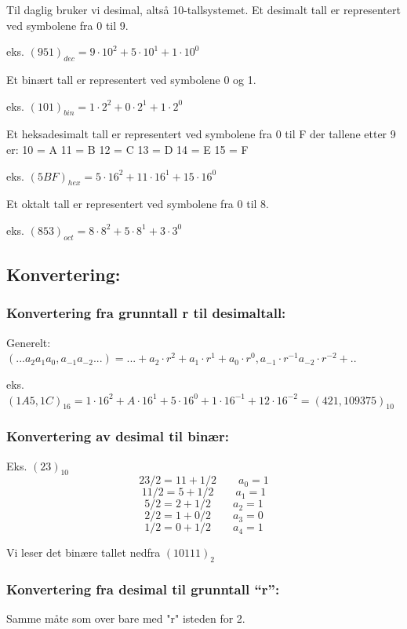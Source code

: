 \documentclass{article}
\begin{document}
	Til daglig bruker vi desimal, altså 10-tallsystemet. Et desimalt tall er representert ved symbolene fra 0 til 9.
	
	eks. $(951)_{dec} = 9 \cdot 10^2 + 5 \cdot 10^1 + 1 \cdot 10^0$
	
	Et binært tall er representert ved symbolene 
	0 og 1.
	
	eks. $ (101)_{bin} = 1 \cdot 2^2 + 0 \cdot 2^1 + 1 \cdot 2^0$
	
	Et heksadesimalt tall er representert ved symbolene 
	fra 0 til F der tallene etter 9 er:
	10 = A
	11 = B
	12 = C
	13 = D
	14 = E
	15 = F
	
	eks. $(5BF)_{hex} = 5 \cdot 16^2 + 11 \cdot 16^1 + 15 \cdot 16^0$ 
	
	Et oktalt tall er representert ved symbolene fra 0 til 8.
	
	eks. $(853)_{oct} = 8 \cdot 8^2 + 5 \cdot 8^1 + 3 \cdot 3^0$

	\subsection*{Konvertering:}
	
	\subsubsection*{Konvertering fra grunntall r til desimaltall:}
	Generelt:
	$(...a_2 a_1 a_0 , a_{-1} a_{-2}...) = ... + a_2 \cdot r^2 + a_1 \cdot r^1 + a_0 \cdot r^0 , a_{-1} \cdot r^{-1} a_{-2} \cdot r^{-2} + ..$
	
	eks.
	$(1A5,1C)_{16} = 1 \cdot 16^2 + A \cdot 16^1 + 5 \cdot 16^0 + 1 \cdot 16^{-1} + 12 \cdot 16^{-2} = (421,109375)_{10}$
	
	
	
	\subsubsection*{Konvertering av desimal til binær:}
	
	Eks. $(23)_{10}$
	$$ 23/2 = 11 + 1/2 \qquad a_0 = 1 $$
	$$ 11/2 = 5 + 1/2 \qquad a_1 = 1 $$
	$$ 5/2 = 2 + 1/2 \qquad a_2 = 1 $$	
	$$ 2/2 = 1 + 0/2 \qquad a_3 = 0 
	$$
	$$1/2 = 0 + 1/2 \qquad a_4 = 1
	$$
	
	Vi leser det binære tallet nedfra $(10111)_{2}$
	
	
	\subsubsection*{Konvertering fra desimal til grunntall “r”:}
	Samme måte som over bare med "r" isteden for 2.
	
\end{document}
